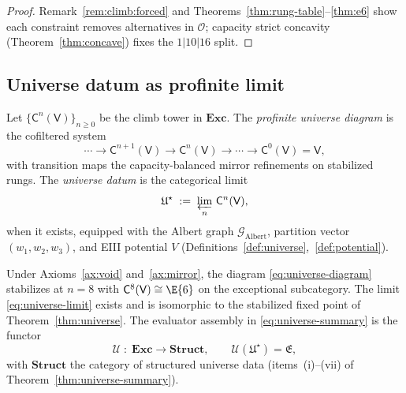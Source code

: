 \begin{proof}
Remark~\ref{rem:climb:forced} and Theorems~\ref{thm:rung-table}--\ref{thm:e6}
show each constraint removes alternatives in $\mathcal{O}$; capacity strict
concavity (Theorem~\ref{thm:concave}) fixes the $1|10|16$ split.
\end{proof}

\subsection{Universe datum as profinite limit}
\label{sec:formal-foundations:universe}

\begin{definition}\label{def:universe-limit}
Let $\{\mathsf{C}^n(\mathsf{V})\}_{n\geq 0}$ be the climb tower in
$\mathbf{Exc}$. The \emph{profinite universe diagram} is the cofiltered system
\begin{equation}\label{eq:universe-diagram}
  \cdots \longrightarrow \mathsf{C}^{n+1}(\mathsf{V}) \longrightarrow
  \mathsf{C}^{n}(\mathsf{V}) \longrightarrow \cdots \longrightarrow
  \mathsf{C}^{0}(\mathsf{V})=\mathsf{V},
\end{equation}
with transition maps the capacity-balanced mirror refinements on stabilized
rungs. The \emph{universe datum} is the categorical limit
\begin{equation}\label{eq:universe-limit}
  \mathfrak{U}^\star
  \;:=\;
  \varprojlim_{n}\,\mathsf{C}^{n}(\mathsf{V}),
\end{equation}
when it exists, equipped with the Albert graph $\mathcal{G}_{\mathrm{Albert}}$,
partition vector $(w_1,w_2,w_3)$, and EIII potential $V$
(Definitions~\ref{def:universe},~\ref{def:potential}).
\end{definition}

\begin{theorem}
\label{thm:formal-universe-exists}
Under Axioms~\ref{ax:void} and~\ref{ax:mirror}, the diagram
\eqref{eq:universe-diagram} stabilizes at $n=8$ with
$\mathsf{C}^{8}(\mathsf{V})\cong\E{6}$ on the exceptional subcategory. The
limit \eqref{eq:universe-limit} exists and is isomorphic to the stabilized
fixed point of Theorem~\ref{thm:universe}. The evaluator assembly in
\eqref{eq:universe-summary} is the functor
\begin{equation}\label{eq:formal-U}
  \mathcal{U}
  \;:\;
  \mathbf{Exc}\longrightarrow\mathbf{Struct},
  \qquad
  \mathcal{U}(\mathfrak{U}^\star)=\mathfrak{E},
\end{equation}
with $\mathbf{Struct}$ the category of structured universe data
(items~(i)--(vii) of Theorem~\ref{thm:universe-summary}).
\end{theorem}

